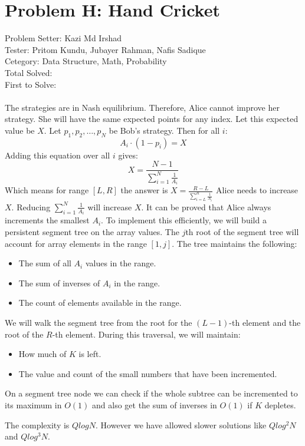 \section*{Problem H: Hand Cricket}
Problem Setter: Kazi Md Irshad \\
Tester: Pritom Kundu, Jubayer Rahman, Nafis Sadique \\
Cetegory: Data Structure, Math, Probability \\
Total Solved:  \\
First to Solve: \\
\\
The strategies are in Nash equilibrium. Therefore, Alice cannot improve her strategy. She will have the same expected points for any index. Let this expected value be $X$. Let $p_1, p_2, \dots, p_N$ be Bob's strategy. Then for all $i$:
$$ A_i \cdot (1 - p_i) = X $$
Adding this equation over all $i$ gives:
$$ X = \frac{N - 1}{\sum_{i=1}^N \frac{1}{A_i}}$$ 
Which means for range $[L,R]$ the answer is $X = \frac{R-L}{\sum_{i=L}^R \frac{1}{A_i}}$
Alice needs to increase $X$. Reducing $\sum_{i=1}^N \frac{1}{A_i}$ will increase $X$. It can be proved that Alice always increments the smallest $A_i$. To implement this efficiently, we will build a persistent segment tree on the array values. The $j$th root of the segment tree will account for array elements in the range $[1, j]$. The tree maintains the following:
\begin{itemize}
    \item The sum of all $A_i$ values in the range.
    \item The sum of inverses of $A_i$ in the range.
    \item The count of elements available in the range.
\end{itemize}
We will walk the segment tree from the root for the $(L-1)$-th element and the root of the $R$-th element. During this traversal, we will maintain:
\begin{itemize}
    \item How much of $K$ is left.
    \item The value and count of the small numbers that have been incremented.
\end{itemize}
On a segment tree node we can check if the whole subtree can be incremented to its maximum in $O(1)$ and also get the sum of inverses in $O(1)$ if $K$ depletes.

The complexity is $QlogN$. However we have allowed slower solutions like $Qlog^2N$ and $Qlog^3N$.
